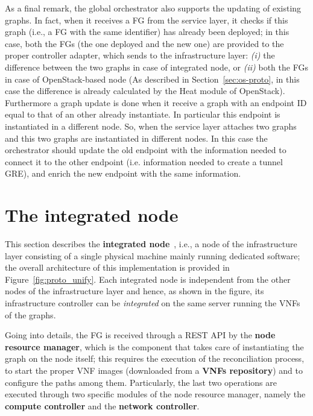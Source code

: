 As a final remark, the global orchestrator also supports the updating of existing graphs. 
In fact, when it receives a FG from the service layer, it checks if this graph (i.e., a FG with the same identifier) has already been deployed; in this case, both the FGs (the one deployed and the new one) are provided to the proper controller adapter, which sends to the infrastructure layer:
\textit{(i)} the difference between the two graphs in case of integrated node, or \textit{(ii)} both the FGs in case of OpenStack-based node (As described in Section~\ref{sec:os-proto}, in this case the difference is already calculated by the Heat module of OpenStack). Furthermore a graph update is done when it receive a graph with an endpoint ID equal to that of an other already instantiate. In particular this endpoint is instantiated in a different node. So, when the service layer attaches two graphs and this two graphs are instantiated in different nodes. In this case the orchestrator should update the old endpoint with the information needed to connect it to the other endpoint (i.e. information needed to create a tunnel GRE), and enrich the new endpoint with the same information.






\section{The integrated node}
\label{sec:single_server_proto}



This section describes the \textbf{integrated node}~\cite{demobudapest}, i.e., a node of the infrastructure layer consisting of a single physical machine mainly running dedicated software; the overall architecture of this implementation is provided in Figure~\ref{fig:proto_unify}.
Each integrated node is independent from the other nodes of the infrastructure layer and hence, as shown in the figure, its infrastructure controller can be \textit{integrated} on the same server running the VNFs of the graphs. 


Going into details, the FG is received through a REST API by the \textbf{node resource manager}, which is the component that takes care of instantiating the graph on the node itself; this requires the execution of the reconciliation process, to start the proper VNF images (downloaded from a \textbf{VNFs repository}) and to configure the paths among them.
Particularly, the last two operations are executed through two specific modules of the node resource manager, namely the \textbf{compute controller} and the \textbf{network controller}.






